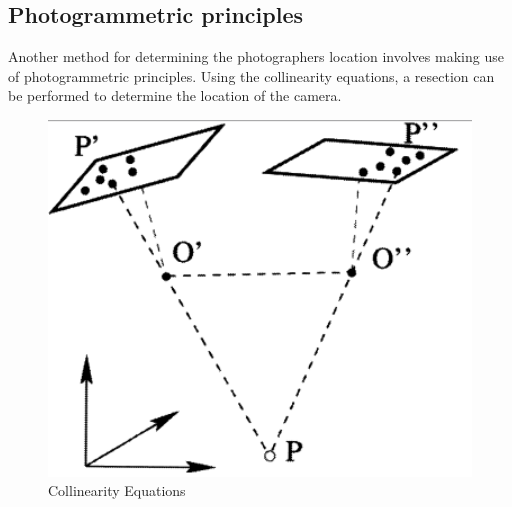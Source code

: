 \documentclass[11pt,a4paper]{report}
\begin{document}
		\subsection{Photogrammetric principles}
			Another method for determining the photographers location involves making use of photogrammetric principles. Using the collinearity equations, a resection can be performed to determine the location of the camera.
			\begin{figure}[H]
				\centering
				\includegraphics[width=1\textwidth]{collinearity_equations}
				\caption{Collinearity Equations}
				\label{fig:collinearity_equations}
			\end{figure}
			
\newpage
\printbibliography
\end{document}
